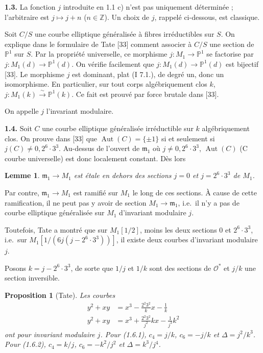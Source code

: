 \documentclass[10pt,a4paper]{amsart}
\theoremstyle{plain}
\newtheorem{lemma}[theorem]{Lemme}
\newtheorem{proposition}[theorem]{Proposition}
\theoremstyle{definition}
\DeclareMathOperator{\Aut}{Aut}
\newcommand{\m}{\mathfrak{m}}
\newcommand{\ZZ}{\mathbb{Z}}
\begin{document}
\medskip\noindent\textbf{1.3.} La fonction $j$ introduite en 1.1 c) n'est pas uniquement d\'etermin\'ee ; l'arbitraire est $j \mapsto j + n$ ($n \in \ZZ$). Un choix de $j$, rappel\'e ci-dessous, est classique.

Soit $C/S$ une courbe elliptique g\'en\'eralis\'ee \`a fibres irr\'eductibles sur $S$. On explique dans le formulaire de Tate [33] comment associer \`a $C/S$ une section de $\mathbb{P}^1$ sur $S$. Par la propri\'et\'e universelle, ce morphisme $j : M_1 \to \mathbb{P}^1$ se factorise par $j : M_1(d) \to \mathbb{P}^1(d)$. On v\'erifie facilement que $j : M_1(d) \to \mathbb{P}^1(d)$ est bijectif [33]. Le morphisme $j$ est dominant, plat (I 7.1.), de degr\'e un, donc un isomorphisme. En particulier, sur tout corps alg\'ebriquement clos $k$, $j : M_1(k) \xrightarrow{\sim} \mathbb{P}^1(k)$. Ce fait est prouv\'e par force brutale dans [33].

On appelle $j$ l'invariant modulaire.

\medskip\noindent\textbf{1.4.} Soit $C$ une courbe elliptique g\'en\'eralis\'ee irr\'eductible sur $k$ alg\'ebriquement clos. On prouve dans [33] que $\Aut(C) = \{\pm 1\}$ si et seulement si $j(C) \not= 0, 2^6 \cdot 3^3$. Au-dessus de l'ouvert de $\m_1$ o\`u $j \not= 0, 2^6 \cdot 3^3$, $\Aut(C)$ (C courbe universelle) est donc localement constant. D\`es lors

\setcounter{theorem}{4}
\begin{lemma}
$\m_1 \to M_1$ est \'etale en dehors des sections $j = 0$ et $j = 2^6 \cdot 3^3$ de $M_1$.
\end{lemma}

Par contre, $\m_1 \to M_1$ est ramifi\'e sur $M_1$ le long de ces sections. \`A cause de cette ramification, il ne peut pas y avoir de section $M_1 \to \m_1$, i.e.\ il n'y a pas de courbe elliptique g\'en\'eralis\'ee sur $M_1$ d'invariant modulaire $j$.

Toutefois, Tate a montr\'e que sur $M_1[1/2]$, moins les deux sections $0$ et $2^6 \cdot 3^3$, i.e.\ sur $M_1[1/(6j(j-2^6 \cdot 3^3))]$, il existe deux courbes d'invariant modulaire $j$.

Posons $k = j - 2^6 \cdot 3^3$, de sorte que $1/j$ et $1/k$ sont des sections de $\mathcal{O}^*$ et $j/k$ une section inversible.

\setcounter{theorem}{5}
\begin{proposition}[Tate]
Les courbes
\begin{align}
y^2 + xy &= x^3 - \frac{2^2 3^2}{k} x - \frac{1}{k}\\
y^2 + xy &= x^3 + \frac{2^2 3^2}{j^2} k x - \frac{1}{j^3} k^2
\end{align}
ont pour invariant modulaire $j$. Pour (1.6.1), $c_4 = j/k$, $c_6 = -j/k$ et $\Delta = j^2/k^3$. Pour (1.6.2), $c_4 = k/j$, $c_6 = -k^2/j^2$ et $\Delta = k^3/j^4$.
\end{proposition}
\end{document}

